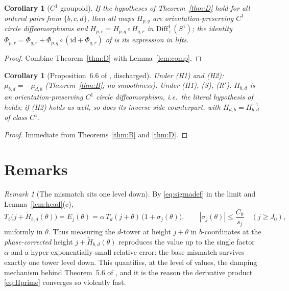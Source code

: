 \documentclass[11pt]{article}
\newtheorem{corollary}[theorem]{Corollary}
\theoremstyle{definition}
\theoremstyle{remark}
\newtheorem{remark}[theorem]{Remark}
\newcommand{\Sone}{S^{1}}
\newcommand{\Tb}{T_{b}}
\newcommand{\Td}{T_{d}}
\newcommand{\Ht}{\widetilde H}
\begin{document}
\begin{corollary}[$C^{1}$ groupoid]\label{cor:groupoid}
If the hypotheses of Theorem~\textup{\ref{thm:D}} hold for all ordered
pairs from $\{b,c,d\}$, then all maps $H_{p,q}$ are orientation-preserving
$C^{1}$ circle diffeomorphisms and
$H_{p,r}=H_{p,q}\circ H_{q,r}$ in $\mathrm{Diff}^{1}_{+}(\Sone)$; the
identity $\Phi_{p,r}=\Phi_{q,r}+\Phi_{p,q}\circ(\mathrm{id}+\Phi_{q,r})$
of \cite[Prop.~6.4]{J} is its expression in lifts.
\end{corollary}

\begin{proof}
Combine Theorem~\ref{thm:D} with Lemma~\ref{lem:comp}.
\end{proof}

\begin{corollary}[Proposition~6.6 of \cite{J}, discharged]\label{cor:66}
Under \textup{(H1)} and \textup{(H2)}: $\mu_{b,d}=-\mu_{d,b}$
(Theorem~\ref{thm:B}; no smoothness). Under \textup{(H1)},
\textup{(S)}, \textup{(R$'$)}: $H_{b,d}$ is an orientation-preserving
$C^{1}$ circle diffeomorphism, i.e.\ the literal hypothesis of
\cite[Prop.~6.6]{J} holds; if \textup{(H2)} holds as well, so does its
inverse-side counterpart, with $H_{d,b}=H_{b,d}^{-1}$ of class $C^{1}$.
\end{corollary}

\begin{proof}
Immediate from Theorems~\ref{thm:B} and \ref{thm:D}.
\end{proof}

\section{Remarks}\label{sec:remarks}

\begin{remark}[The mismatch sits one level down]\label{rem:onelevel}
By \eqref{eq:sigmadef} in the limit and Lemma~\ref{lem:head}(c),
\[
\Tb\big(j+\Ht_{b,d}(\theta)\big)=E_j(\theta)
=\alpha\,\Td(j+\theta)\,\big(1+\sigma_j(\theta)\big),
\qquad
|\sigma_j(\theta)|\le\frac{C_0}{s_j}\quad(j\ge J_0),
\]
uniformly in $\theta$. Thus measuring the $d$-tower at height $j+\theta$
in $b$-coordinates at the \emph{phase-corrected} height
$j+\Ht_{b,d}(\theta)$ reproduces the value up to the single factor
$\alpha$ and a hyper-exponentially small relative error: the base
mismatch survives exactly one tower level down. This quantifies, at the
level of values, the damping mechanism behind Theorem~5.6 of \cite{J},
and it is the reason the derivative product \eqref{eq:Hprime} converges
so violently fast.
\end{remark}
\end{document}
